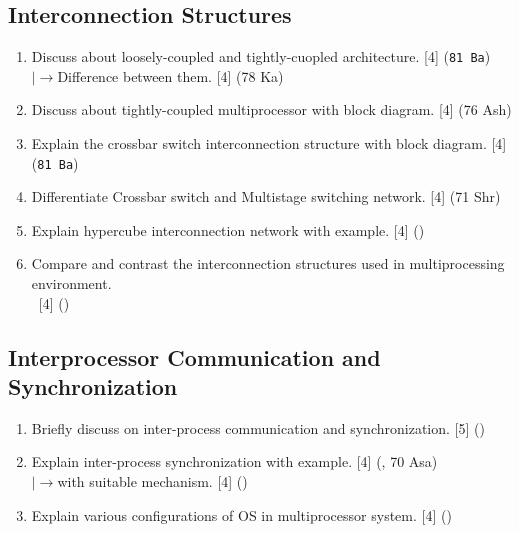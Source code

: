 \documentclass[12pt]{article}
\newcommand{\lb}{\\$\left|\rightarrow\right.$}
\newcommand{\enter}{\\\textcolor{white}{1}}
\begin{document}
	\subsection{Interconnection Structures}
		\begin{enumerate}
			\item Discuss about loosely-coupled and tightly-cuopled architecture. \hfill [4] (\texttt{81 Ba})
			\lb Difference between them. \hfill [4] (78 Ka)

			\item Discuss about tightly-coupled multiprocessor with block diagram. \hfill [4] (76 Ash)

			\item Explain the crossbar switch interconnection structure with block diagram. \hfill [4] (\texttt{81 Ba})

			\item Differentiate Crossbar switch and Multistage switching network. \hfill [4] (71 Shr)

			\item Explain hypercube interconnection network with example. \hfill [4] ()

			\item Compare and contrast the interconnection structures used in multiprocessing environment.
			\enter\hfill [4] () 
		\end{enumerate}

	\subsection{Interprocessor Communication and Synchronization}
		\begin{enumerate}
			\item Briefly discuss on inter-process communication and synchronization. \hfill [5] ()

			\item Explain inter-process synchronization with example. \hfill [4] (, 70 Asa)
			\lb with suitable mechanism. \hfill [4] ()

			\item Explain various configurations of OS in multiprocessor system. \hfill [4] ()
		\end{enumerate}
\end{document}
